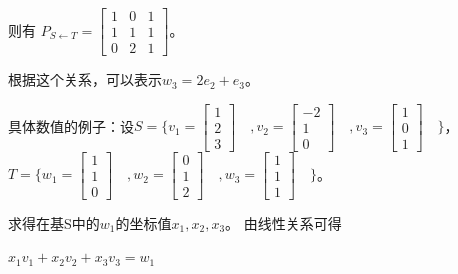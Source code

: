 则有\newline
$P_{S \leftarrow T}=\begin{bmatrix} 1&0&1\\1&1&1\\0&2&1\end{bmatrix}$。

根据这个关系，可以表示$w_3=2e_2+e_3$。

具体数值的例子：设$S=\{ v_1=\begin{bmatrix}1\\2\\3\end{bmatrix}\quad, v_2=\begin{bmatrix}-2\\1\\0\end{bmatrix}\quad 
, v_3=\begin{bmatrix} 1\\0\\1 \end{bmatrix}\quad \}$， $T=\{ w_1=\begin{bmatrix} 1\\1\\0\end{bmatrix}\quad, w_2=\begin{bmatrix}0\\1\\2\end{bmatrix}\quad 
, w_3=\begin{bmatrix} 1\\1\\1 \end{bmatrix}\quad \}$。

求得在基S中的$w_1$的坐标值$x_1,x_2,x_3$。
\newline
由线性关系可得

\begin{math}
    x_1v_1+x_2v_2+x_3v_3=w_1
\end{math}

